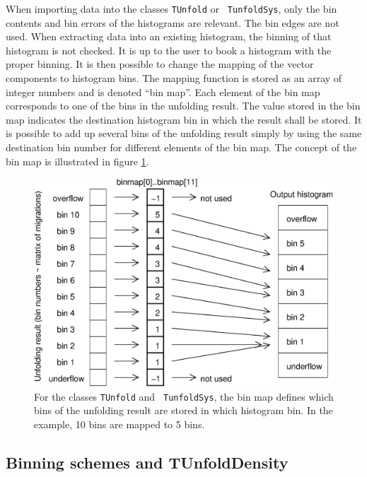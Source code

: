 \documentclass[12pt]{article}
\newlength{\figwidth}
\begin{document}
When importing data into the classes {\tt TUnfold} or {\tt
  TunfoldSys}, only the bin contents and bin errors of the histograms
are relevant. The bin edges are not used.
When extracting data into an existing histogram, the binning of
that histogram is not checked. It is up to the user to book a histogram
with the proper binning. It is then possible to change
the mapping of the vector components to histogram bins. The mapping
function is stored as an array of integer numbers and is denoted
``bin map''. Each element of the bin map corresponds to one of the bins
in the unfolding result. The value stored in the bin map indicates the
destination histogram bin in which the result shall be stored. It is
possible to add up several bins of the unfolding result simply by
using the same destination bin number for different elements of the
bin map. The concept of the bin map is illustrated in figure \ref{fig:binmap}.
\begin{figure}
\begin{center}
\includegraphics[width=0.7\figwidth]{fig/tunfold_manual_fig1.eps}
\end{center}
\caption{\label{fig:binmap} For the classes {\tt TUnfold} and {\tt
  TunfoldSys}, the bin map defines which bins of the unfolding result
are stored in which histogram bin. In the example, 10 bins are mapped
to 5 bins.}
\end{figure}

\subsection{Binning schemes and TUnfoldDensity}
\end{document}
